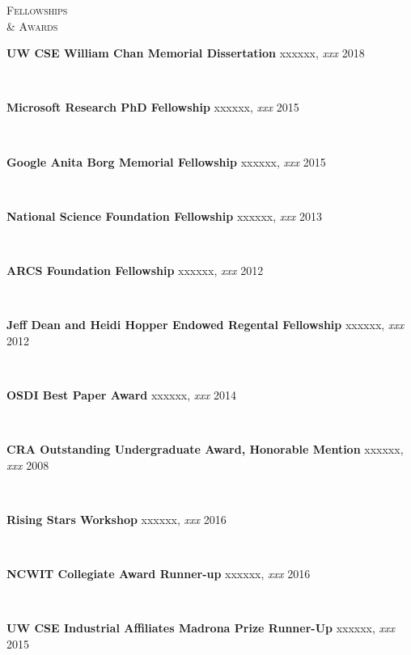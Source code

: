 \documentclass[10pt,minionpro]{report}
\newlength{\sectiongap}
\newlength{\entrygap}
\newlength{\sectioncolwidth}
\newlength{\colgap}
\newlength{\stuffwidth}
\def\ifEqString#1#2{\def\testa{#1}\def\testb{#2}%
  \ifx\testa\testb}
\newenvironment{rtable}{
  \begin{minipage}{\textwidth}
  }{
  \end{minipage}
}
\newenvironment{rentry}[3][xxx]{
  \begin{minipage}[t]{\hsize}
    \textbf{#2}\ifEqString{#1}{xxx}\relax\else, \textit{#1}\fi
    \hspace{\stretch{1}} #3 \\
  }{
    \removelastskip
  \end{minipage}
  \\[\entrygap]  %
}
\newenvironment{rsection}[1]{
  \begin{minipage}[t]{\sectioncolwidth}
    \textsc{#1}
  \end{minipage}
  \hspace{\colgap}
  \begin{minipage}[t]{\stuffwidth}
  }{
    \removelastskip
  \end{minipage}
  \\[\sectiongap]
}
\begin{document}
\begin{rtable}
  \begin{rsection}{Fellowships\\\& Awards}
    \begin{rentry}{UW CSE William Chan Memorial Dissertation}{2018}
      \vspace{-0.75em}
    \end{rentry} 
    \begin{rentry}{Microsoft Research PhD Fellowship}{2015}
      \vspace{-0.75em}
    \end{rentry} 
    \begin{rentry}{Google Anita Borg Memorial Fellowship}{2015}
      \vspace{-0.75em}
    \end{rentry} 
    \begin{rentry}{National Science Foundation Fellowship}{2013}
      \vspace{-0.75em}
    \end{rentry}
    \begin{rentry}{ARCS Foundation Fellowship}{2012}
       \vspace{-0.75em}
    \end{rentry}
    \begin{rentry}{Jeff Dean and Heidi Hopper Endowed Regental Fellowship}{2012}
       \vspace{-0.75em}
    \end{rentry}
    \begin{rentry}{OSDI Best Paper Award}{2014}
      \vspace{-0.75em}
    \end{rentry}
    \begin{rentry}{CRA Outstanding Undergraduate Award, Honorable
      Mention}{2008}
    \vspace{-0.75em}
    \end{rentry}
    \begin{rentry}{Rising Stars Workshop}{2016}
      \vspace{-0.75em}
    \end{rentry} 
    \begin{rentry}{NCWIT Collegiate Award Runner-up}{2016}
      \vspace{-0.75em}
    \end{rentry} 
    \begin{rentry}{UW CSE Industrial Affiliates Madrona Prize Runner-Up}{2015}
     \vspace{-0.75em}
    \end{rentry} 

\end{rsection}
\end{rtable}
\end{document}
